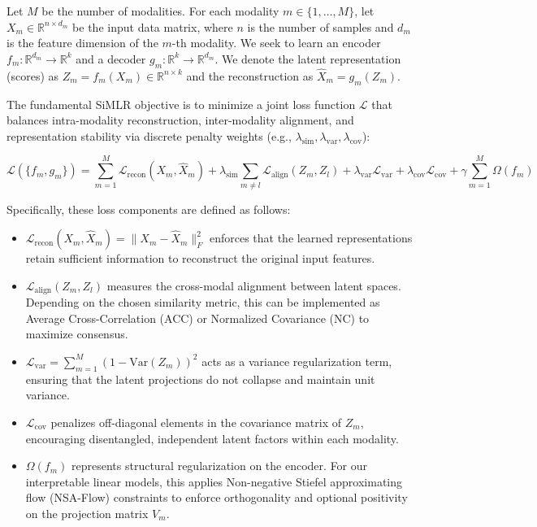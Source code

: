 \documentclass[
  letterpaper,
]{report}
\providecommand{\tightlist}{%
  \setlength{\itemsep}{0pt}\setlength{\parskip}{0pt}}
\begin{document}
Let \(M\) be the number of modalities. For each modality
\(m \in \{1, \dots, M\}\), let \(X_m \in \mathbb{R}^{n \times d_m}\) be
the input data matrix, where \(n\) is the number of samples and \(d_m\)
is the feature dimension of the \(m\)-th modality. We seek to learn an
encoder \(f_m: \mathbb{R}^{d_m} \to \mathbb{R}^k\) and a decoder
\(g_m: \mathbb{R}^k \to \mathbb{R}^{d_m}\). We denote the latent
representation (scores) as
\(Z_m = f_m(X_m) \in \mathbb{R}^{n \times k}\) and the reconstruction as
\(\hat{X}_m = g_m(Z_m)\).

The fundamental SiMLR objective is to minimize a joint loss function
\(\mathcal{L}\) that balances intra-modality reconstruction,
inter-modality alignment, and representation stability via discrete
penalty weights (e.g.,
\(\lambda_{\text{sim}}, \lambda_{\text{var}}, \lambda_{\text{cov}}\)):

\[
\mathcal{L}(\{f_m, g_m\}) = \sum_{m=1}^M \mathcal{L}_{\text{recon}}(X_m, \hat{X}_m) + \lambda_{\text{sim}} \sum_{m \neq l} \mathcal{L}_{\text{align}}(Z_m, Z_l) + \lambda_{\text{var}} \mathcal{L}_{\text{var}} + \lambda_{\text{cov}} \mathcal{L}_{\text{cov}} + \gamma \sum_{m=1}^M \Omega(f_m)
\]

Specifically, these loss components are defined as follows:

\begin{itemize}
\tightlist
\item
  \(\mathcal{L}_{\text{recon}}(X_m, \hat{X}_m) = \| X_m - \hat{X}_m \|_F^2\)
  enforces that the learned representations retain sufficient
  information to reconstruct the original input features.
\item
  \(\mathcal{L}_{\text{align}}(Z_m, Z_l)\) measures the cross-modal
  alignment between latent spaces. Depending on the chosen similarity
  metric, this can be implemented as Average Cross-Correlation (ACC) or
  Normalized Covariance (NC) to maximize consensus.
\item
  \(\mathcal{L}_{\text{var}} = \sum_{m=1}^M (1 - \text{Var}(Z_m))^2\)
  acts as a variance regularization term, ensuring that the latent
  projections do not collapse and maintain unit variance.
\item
  \(\mathcal{L}_{\text{cov}}\) penalizes off-diagonal elements in the
  covariance matrix of \(Z_m\), encouraging disentangled, independent
  latent factors within each modality.
\item
  \(\Omega(f_m)\) represents structural regularization on the encoder.
  For our interpretable linear models, this applies Non-negative Stiefel
  approximating flow (NSA-Flow) constraints to enforce orthogonality and
  optional positivity on the projection matrix \(V_m\).
\end{itemize}
\end{document}
